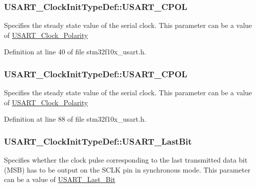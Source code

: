 \subsubsection[{\texorpdfstring{U\+S\+A\+R\+T\+\_\+\+C\+P\+OL}{USART_CPOL}}]{ U\+S\+A\+R\+T\+\_\+\+Clock\+Init\+Type\+Def\+::\+U\+S\+A\+R\+T\+\_\+\+C\+P\+OL}\hypertarget{struct_u_s_a_r_t___clock_init_type_def_ab6682632adcef3cb4955bc1e5cb1b262}{}\label{struct_u_s_a_r_t___clock_init_type_def_ab6682632adcef3cb4955bc1e5cb1b262}
Specifies the steady state value of the serial clock. This parameter can be a value of \hyperlink{group___u_s_a_r_t___clock___polarity}{U\+S\+A\+R\+T\+\_\+\+Clock\+\_\+\+Polarity} 

Definition at line 40 of file stm32f10x\+\_\+usart.\+h.

\subsubsection[{\texorpdfstring{U\+S\+A\+R\+T\+\_\+\+C\+P\+OL}{USART_CPOL}}]{ U\+S\+A\+R\+T\+\_\+\+Clock\+Init\+Type\+Def\+::\+U\+S\+A\+R\+T\+\_\+\+C\+P\+OL}\hypertarget{struct_u_s_a_r_t___clock_init_type_def_a01450cba8a40cf9a624b25979dc6aa77}{}\label{struct_u_s_a_r_t___clock_init_type_def_a01450cba8a40cf9a624b25979dc6aa77}
Specifies the steady state value of the serial clock. This parameter can be a value of \hyperlink{group___u_s_a_r_t___clock___polarity}{U\+S\+A\+R\+T\+\_\+\+Clock\+\_\+\+Polarity} 

Definition at line 88 of file stm32f10x\+\_\+usart.\+h.

\subsubsection[{\texorpdfstring{U\+S\+A\+R\+T\+\_\+\+Last\+Bit}{USART_LastBit}}]{ U\+S\+A\+R\+T\+\_\+\+Clock\+Init\+Type\+Def\+::\+U\+S\+A\+R\+T\+\_\+\+Last\+Bit}\hypertarget{struct_u_s_a_r_t___clock_init_type_def_ad4ffff3608ed5d5657500476cbe22453}{}\label{struct_u_s_a_r_t___clock_init_type_def_ad4ffff3608ed5d5657500476cbe22453}
Specifies whether the clock pulse corresponding to the last transmitted data bit (M\+SB) has to be output on the S\+C\+LK pin in synchronous mode. This parameter can be a value of \hyperlink{group___u_s_a_r_t___last___bit}{U\+S\+A\+R\+T\+\_\+\+Last\+\_\+\+Bit} 

